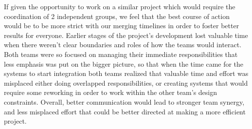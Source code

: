 \documentclass{article}
\begin{document}
If given the opportunity to work on a similar project which would require the coordination of 2 independent groups, we feel that the best course of action would be to be more strict with our merging timelines in order to foster better results for everyone. Earlier stages of the project's development lost valuable time when there weren't clear boundaries and roles of how the teams would interact. Both teams were so focused on managing their immediate responsibilities that less emphasis was put on the bigger picture, so that when the time came for the systems to start integration both teams realized that valuable time and effort was misplaced either doing overlapped responsibilities, or creating systems that would require some reworking in order to work within the other team's design constraints. Overall, better communication would lead to stronger team synergy, and less misplaced effort that could be better directed at making a more efficient project. 
\end{document}

